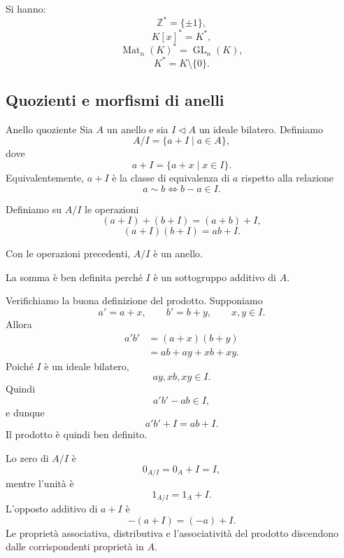 \documentclass[a4paper]{article}
\begin{document}
\begin{radioactive}
\begin{snippetexample}{}
    Si hanno:
    \[
        \mathbb{Z}^\ast=\{\pm 1\},
    \]
    \[
        K[x]^\ast=K^\ast,
    \]
    \[
        \operatorname{Mat}_n(K)^\ast=\operatorname{GL}_n(K),
    \]
    \[
        K^\ast=K\setminus\{0\}.
    \]
\end{snippetexample}
\end{radioactive}

\subsection{Quozienti e morfismi di anelli}

\begin{radioactive}
\begin{snippetdefinition}{Anello quoziente}
    Sia \(A\) un anello e sia \(I\triangleleft A\) un ideale bilatero.
    Definiamo
    \[
        A/I
        =
        \{a+I\mid a\in A\},
    \]
    dove
    \[
        a+I=\{a+x\mid x\in I\}.
    \]
    Equivalentemente, \(a+I\) è la classe di equivalenza di \(a\) rispetto alla relazione
    \[
        a\sim b
        \iff
        b-a\in I.
    \]
\end{snippetdefinition}
\end{radioactive}

\begin{radioactive}
Definiamo su \(A/I\) le operazioni
\[
    (a+I)+(b+I)=(a+b)+I,
\]
\[
    (a+I)(b+I)=ab+I.
\]
\end{radioactive}

\begin{radioactive}
\begin{snippetproposition}{}
    Con le operazioni precedenti, \(A/I\) è un anello.
\end{snippetproposition}
\end{radioactive}

\begin{radioactive}
\begin{snippetproof}{}
    La somma è ben definita perché \(I\) è un sottogruppo additivo di \(A\).

    Verifichiamo la buona definizione del prodotto.
    Supponiamo
    \[
        a'=a+x,
        \qquad
        b'=b+y,
        \qquad
        x,y\in I.
    \]
    Allora
    \begin{align*}
        a'b'
        &=
        (a+x)(b+y) \\
        &=
        ab+ay+xb+xy.
    \end{align*}
    Poiché \(I\) è un ideale bilatero,
    \[
        ay,xb,xy\in I.
    \]
    Quindi
    \[
        a'b'-ab\in I,
    \]
    e dunque
    \[
        a'b'+I=ab+I.
    \]
    Il prodotto è quindi ben definito.

    Lo zero di \(A/I\) è
    \[
        0_{A/I}=0_A+I=I,
    \]
    mentre l'unità è
    \[
        1_{A/I}=1_A+I.
    \]
    L'opposto additivo di \(a+I\) è
    \[
        -(a+I)=(-a)+I.
    \]
    Le proprietà associativa, distributiva e l'associatività del prodotto discendono dalle corrispondenti proprietà in \(A\).
\end{snippetproof}
\end{radioactive}
\end{document}
